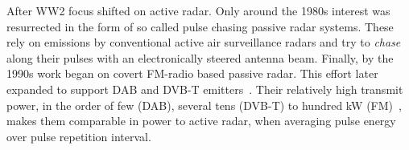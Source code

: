 After WW2 focus shifted on active radar. Only around the 1980s interest was resurrected in the form of so called pulse chasing passive radar systems. These rely on emissions by  conventional active air surveillance radars and try to \emph{chase} along their pulses with an electronically steered antenna beam. Finally, by the 1990s work began on covert FM-radio based passive radar. This effort later expanded to support DAB and DVB-T emitters~\cite{Kuschel2013}. Their relatively high transmit power, in the order of few (DAB), several tens (DVB-T) to hundred \si{\kilo\watt} (FM)~\cite[p.~48, 57, 64]{Malanowski2019}, makes them comparable in power to active radar, when averaging pulse energy over pulse repetition interval.
